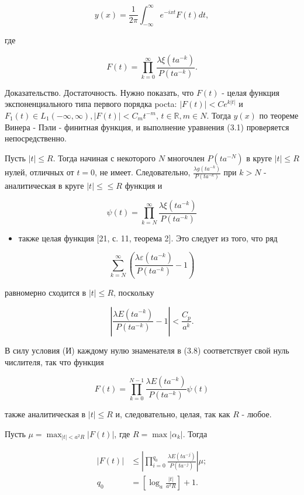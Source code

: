 \documentclass[10pt]{article}
\begin{document}
$$
y(x)=\frac{1}{2 \pi} \int_{-\infty}^{\infty} e^{-i x t} F(t) d t,
$$

где


\begin{equation*}
F(t)=\prod_{k=0}^{\infty} \frac{\lambda \xi\left(t a^{-k}\right)}{P\left(t a^{-k}\right)} . \tag{3.8}
\end{equation*}


Доказательство. Достаточность. Нужно показать, что $F(t)$ - целая функция экспоненциального типа первого порядка pocta: $|F(t)|<C e^{k|t|}$ и $F_{1}(t) \in L_{1}(-\infty, \infty),|F(t)|<C_{m} t^{-m}$, $t \in \mathbb{R}, m \in N$. Тогда $y(x)$ по теореме Винера - Пэли - финитная функция, и выполнение уравнения (3.1) проверяется непосредственно.

Пусть $|t| \leqslant R$. Тогда начиная с некоторого $N$ многочлен $P\left(t a^{-N}\right)$ в круге $|t| \leqslant R$ нулей, отличных от $t=0$, не имеет. Следовательно, $\frac{\lambda g\left(t a^{-k}\right)}{P\left(t a^{-k}\right)}$ при $k>N$ - аналитическая в круге $|t| \leqslant \leqslant R$ функция и

$$
\psi(t)=\prod_{k=N}^{\infty} \frac{\lambda \xi\left(t a^{-k}\right)}{P\left(t a^{-k}\right)}
$$

\begin{itemize}
  \item также целая функция [21, с. 11, теорема 2]. Это следует из того, что ряд
\end{itemize}

$$
\sum_{k=N}^{\infty}\left(\frac{\lambda \varepsilon\left(t a^{-k}\right)}{P\left(t a^{-k}\right)}-1\right)
$$

равномерно сходится в $|t| \leqslant R$, поскольку

$$
\left|\frac{\lambda E\left(t a^{-k}\right)}{P\left(t a^{-k}\right)}-1\right|<\frac{C_{p}}{a^{k}} .
$$

В силу условия (И) каждому нулю знаменателя в (3.8) соответствует свой нуль числителя, так что функция

$$
F(t)=\prod_{k=0}^{N-1} \frac{\lambda E\left(t a^{-k}\right)}{P\left(t a^{-k}\right)} \psi(t)
$$

также аналитическая в $|t| \leqslant R$ и, следовательно, целая, так как $R$ - любое.

Пусть $\mu=\max _{|t|<a^{2} R}|F(t)|$, где $R=\max \left|\alpha_{k}\right|$. Тогда

$$
\begin{aligned}
|F(t)| & \leqslant\left|\prod_{i=0}^{q_{0}} \frac{\lambda E\left(t a^{-j}\right)}{P\left(t a^{-j}\right)}\right| \mu ; \\
q_{0} & =\left[\log _{a} \frac{|t|}{a^{2} R}\right]+1 .
\end{aligned}
$$
\end{document}
